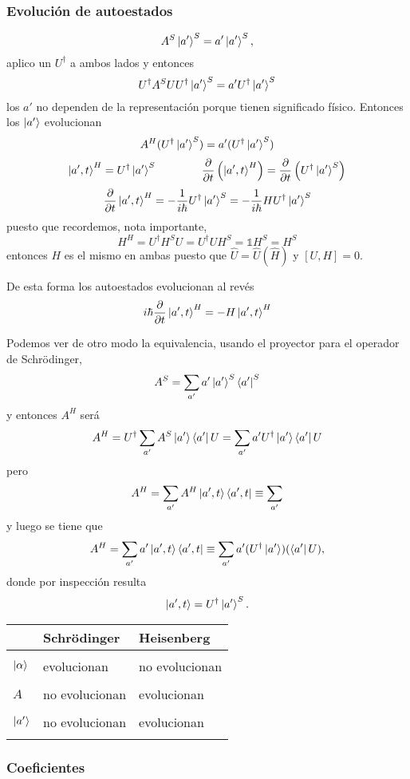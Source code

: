 \documentclass[10pt,oneside]{CBFT_book}
\begin{document}
\subsubsection{Evolución de autoestados}

\[
	A^S \Ket{a'}^S = a' \Ket{a'}^S,
\]
aplico un $U^\dagger$ a ambos lados y entonces 
\[
	U^\dagger A^S UU^\dagger \Ket{a'}^S = a' U^\dagger \Ket{a'}^S
\]
los $a'$ no dependen de la representación porque tienen significado físico. 
Entonces los $\Ket{a'}$ evolucionan
\[
	A^H (U^\dagger\Ket{a'}^S) = a' (U^\dagger\Ket{a'}^S)
\]
\[
	\Ket{a',t}^H = U^\dagger \Ket{a'}^S \qquad \qquad \frac{\partial^{\hspace{-0.05em}} {}}{\partial {t}^{\hspace{-0.05em}}}\left( \Ket{a',t}^H \right) = 
	\frac{\partial^{\hspace{-0.05em}} {}}{\partial {t}^{\hspace{-0.05em}}} \left( U^\dagger \Ket{a'}^S \right)
\]
\[
	\frac{\partial^{\hspace{-0.05em}} {}}{\partial {t}^{\hspace{-0.05em}}}\Ket{a',t}^H = -\frac{1}{i\hbar} U^\dagger \Ket{a'}^S =  -\frac{1}{i\hbar} H U^\dagger 
	\Ket{a'}^S
\]
puesto que recordemos, nota importante,
\[
	H^H = U^\dagger H^S U = U^\dagger U H^S = \mathbb{1}H^S = H^S
\]
entonces $H$ es el mismo en ambas puesto que $\hat{U} =\hat{U}(\hat{H})$ y $[U,H]=0$.

De esta forma los autoestados evolucionan al revés 
\[
	i\hbar \frac{\partial^{\hspace{-0.05em}} {}}{\partial {t}^{\hspace{-0.05em}}} \Ket{a',t}^H = -H\Ket{a',t}^H
\]

Podemos ver de otro modo la equivalencia, usando el proyector para el operador de Schrödinger,
\[
	A^S = \sum_{a'} a' \Ket{a'}^S\Bra{a'}^S
\]
y entonces $A^H$ será
\[
	A^H = U^\dagger \sum_{a'} A^S \Ket{a'}\Bra{a'}U = 
	\sum_{a'} a'U^\dagger \Ket{a'}\Bra{a'}U
\]
pero 
\[
	A^H = \sum_{a'} A^H \Ket{a',t}\Bra{a',t} \equiv \sum_{a'}
\]
y luego se tiene que
\[
	A^H = \sum_{a'} a' \Ket{a',t}\Bra{a',t} \equiv \sum_{a'} a'(U^\dagger\Ket{a'})(\Bra{a'}U),
\]
donde por inspección resulta
\[
	\Ket{a',t} = U^\dagger\Ket{a'}^S.
\]

\begin{center}
\begin{tabular}{|l|l|l|}
\hline
	&	Schrödinger 	& Heisenberg \\
\hline
& & \\
$\Ket{\alpha}$ & evolucionan & no evolucionan \\
& & \\
$A$ & no evolucionan & evolucionan \\
& & \\
$\Ket{a'}$ & no evolucionan & evolucionan \\
& & \\
\hline
\end{tabular}
\end{center}

\subsubsection{Coeficientes}
\end{document}
